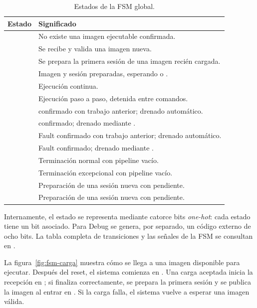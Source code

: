 \begin{table}[H]
  \centering
  \small
  \begin{tabularx}{\textwidth}{L{4.2cm}Y}
    \toprule
    \textbf{Estado} & \textbf{Significado} \\
    \midrule
     & No existe una imagen ejecutable confirmada. \\
     & Se recibe y valida una imagen nueva. \\
     & Se prepara la primera sesión de una imagen
    recién cargada. \\
     & Imagen y sesión preparadas, esperando  o
    . \\
     & Ejecución continua. \\
     & Ejecución paso a paso, detenida entre comandos. \\
     &  confirmado con trabajo anterior;
    drenado automático. \\
     &  confirmado; drenado mediante
    . \\
     & Fault confirmado con trabajo anterior; drenado
    automático. \\
     & Fault confirmado; drenado mediante . \\
     & Terminación normal con pipeline vacío. \\
     & Terminación excepcional con pipeline vacío. \\
     & Preparación de una sesión nueva con 
    pendiente. \\
     & Preparación de una sesión nueva con 
    pendiente. \\
    \bottomrule
  \end{tabularx}
  \caption{Estados de la FSM global.}
  \label{tab:estados}
\end{table}

Internamente, el estado se representa mediante catorce bits \emph{one-hot}:
cada estado tiene un bit asociado. Para Debug se genera, por separado, un código
externo de ocho bits. La tabla completa de transiciones y las señales de la FSM
se consultan en
.

La figura~\ref{fig:fsm-carga} muestra cómo se llega a una imagen disponible
para ejecutar. Después del reset, el sistema comienza en . Una
carga aceptada inicia la recepción en ; si finaliza correctamente,
se prepara la primera sesión y se publica la imagen al entrar en .
Si la carga falla, el sistema vuelve a esperar una imagen válida.

